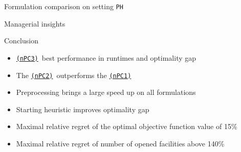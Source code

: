 \documentclass[utf8,aspectratio=169,ngerman,english]{beamer}
\newcommand{\nPC}{\hyperref[eq:nPC]{\texttt{(nPC1)}}\xspace}
\newcommand{\nPCE}{\hyperref[eq:nPCE]{\texttt{(nPC3)}}\xspace}
\newcommand{\nPCY}{\hyperref[eq:nPCY]{\texttt{(nPC2)}}\xspace}
\newcommand{\sH}{\texttt{PH}\xspace}
\begin{document}
\begin{frame}{Formulation comparison on setting \sH}
    \begin{figure}
        \begin{minipage}[c]{.48\linewidth}
        \end{minipage}
        \hfill
        \begin{minipage}[c]{.48\linewidth}
        \end{minipage}
        \label{fig:PH}
    \end{figure}
\end{frame}

\begin{frame}{Managerial insights}
    \begin{figure}
        \begin{minipage}[r]{.48\linewidth}
        \end{minipage}
        \hfill
        \begin{minipage}[l]{.48\linewidth}
        \end{minipage}
        \label{fig:manage}
    \end{figure}
\end{frame}


\begin{frame}{Conclusion}
    \begin{itemize}
        \item \nPCE\ best performance in runtimes and optimality gap
        \item The \nPCY\ outperforms the \nPC
        \item Preprocessing brings a large speed up on all formulations
        \item Starting heuristic improves optimality gap 
        \item Maximal relative regret of the optimal objective function value of 15\%
        \item Maximal relative regret of number of opened facilities above 140\%
    \end{itemize}
\end{frame}
\end{document}
